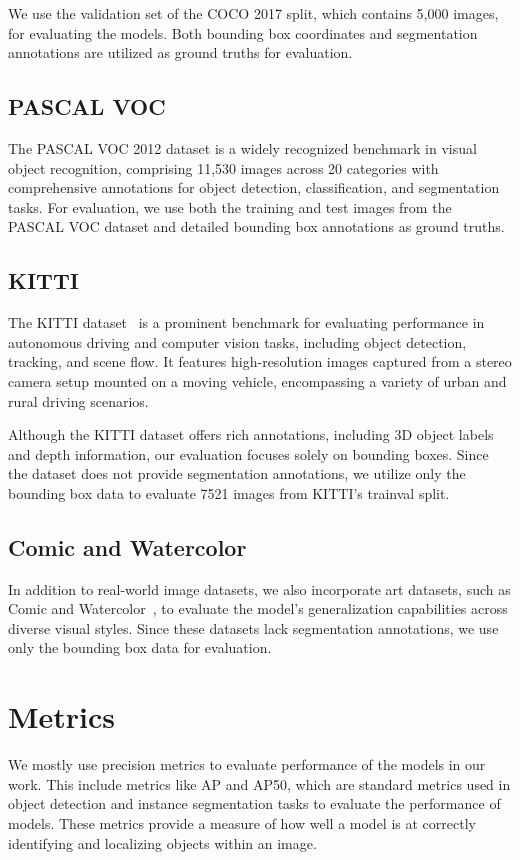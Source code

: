 We use the validation set of the COCO 2017 split, which contains 5,000 images, for evaluating the models. Both bounding box coordinates and segmentation annotations are utilized as ground truths for evaluation.

\subsection{PASCAL VOC}
The PASCAL VOC 2012 dataset is a widely recognized benchmark in visual object recognition, comprising 11,530 images across 20 categories with comprehensive annotations for object detection, classification, and segmentation tasks. For evaluation, we use both the training and test images from the PASCAL VOC dataset and detailed bounding box annotations as ground truths.

\subsection{KITTI}
The KITTI dataset~\cite{Geiger2013IJRR} is a prominent benchmark for evaluating performance in autonomous driving and computer vision tasks, including object detection, tracking, and scene flow. It features high-resolution images captured from a stereo camera setup mounted on a moving vehicle, encompassing a variety of urban and rural driving scenarios. 

Although the KITTI dataset offers rich annotations, including 3D object labels and depth information, our evaluation focuses solely on bounding boxes. Since the dataset does not provide segmentation annotations, we utilize only the bounding box data to evaluate 7521 images from KITTI’s trainval split.

\subsection{Comic and Watercolor}
In addition to real-world image datasets, we also incorporate art datasets, such as Comic and Watercolor~\cite{Inoue_2018_CVPR}, to evaluate the model's generalization capabilities across diverse visual styles. Since these datasets lack segmentation annotations, we use only the bounding box data for evaluation.

\section{Metrics}
We mostly use precision metrics to evaluate performance of the models in our work. This include metrics like AP and AP50, which are standard metrics used in object detection and instance segmentation tasks to evaluate the performance of models. These metrics provide a measure of how well a model is at correctly identifying and localizing objects within an image.

